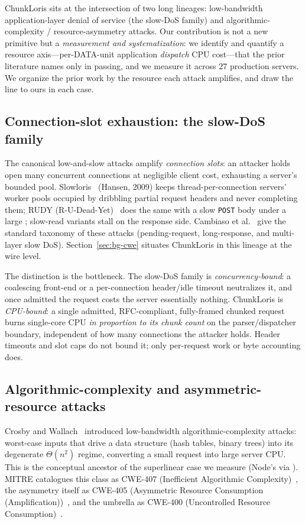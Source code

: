 ChunkLoris sits at the intersection of two long lineages: low-bandwidth
application-layer denial of service (the slow-DoS family) and
algorithmic-complexity / resource-asymmetry attacks. Our contribution is
not a new primitive but a \emph{measurement and systematization}: we
identify and quantify a resource axis---per-DATA-unit application
\emph{dispatch} CPU cost---that the prior literature names only in
passing, and we measure it across \num{27} production servers. We
organize the prior work by the resource each attack amplifies, and draw
the line to ours in each case.

\subsection{Connection-slot exhaustion: the slow-DoS family}
\label{sec:rel-slowdos}

The canonical low-and-slow attacks amplify \emph{connection slots}: an
attacker holds open many concurrent connections at negligible client
cost, exhausting a server's bounded pool. Slowloris~\cite{slowloris}
(Hansen, 2009) keeps thread-per-connection servers' worker pools occupied
by dribbling partial request headers and never completing them; RUDY
(R-U-Dead-Yet)~\cite{rudy} does the same with a slow \texttt{POST} body
under a large ; slow-read variants stall on the
response side. Cambiaso et al.~\cite{cambiaso_survey} give the standard
taxonomy of these attacks (pending-request, long-response, and
multi-layer slow DoS). Section~\ref{sec:bg-cwe} situates ChunkLoris in
this lineage at the wire level.

The distinction is the bottleneck. The slow-DoS family is
\emph{concurrency-bound}: a coalescing front-end or a per-connection
header/idle timeout neutralizes it, and once admitted the request costs
the server essentially nothing. ChunkLoris is \emph{CPU-bound}: a single
admitted, RFC-compliant, fully-framed chunked request burns single-core
CPU \emph{in proportion to its chunk count} on the parser/dispatcher
boundary, independent of how many connections the attacker holds. Header
timeouts and slot caps do not bound it; only per-request work or byte
accounting does.

\subsection{Algorithmic-complexity and asymmetric-resource attacks}
\label{sec:rel-complexity}

Crosby and Wallach~\cite{crosby2003} introduced low-bandwidth
algorithmic-complexity attacks: worst-case inputs that drive a data
structure (hash tables, binary trees) into its degenerate
$\Theta(n^2)$ regime, converting a small request into large server CPU.
This is the conceptual ancestor of the superlinear case we measure
(Node's  via ). MITRE
catalogues this class as CWE-407 (Inefficient Algorithmic
Complexity)~\cite{cwe407}, the asymmetry itself as CWE-405 (Asymmetric
Resource Consumption (Amplification))~\cite{cwe405}, and the umbrella as
CWE-400 (Uncontrolled Resource Consumption)~\cite{cwe400}.

